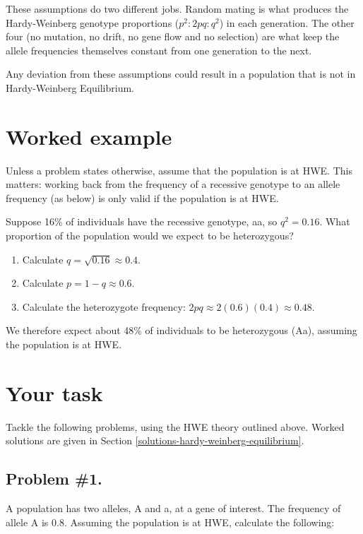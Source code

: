 \documentclass[
  a4paper]{book}
\providecommand{\tightlist}{%
  \setlength{\itemsep}{0pt}\setlength{\parskip}{0pt}}
\begin{document}
These assumptions do two different jobs. Random mating is what produces the Hardy-Weinberg genotype proportions (\(p^2 : 2pq : q^2\)) in each generation. The other four (no mutation, no drift, no gene flow and no selection) are what keep the allele frequencies themselves constant from one generation to the next.

Any deviation from these assumptions could result in a population that is not in Hardy-Weinberg Equilibrium.

\section{Worked example}\label{worked-example-8}

Unless a problem states otherwise, assume that the population is at HWE. This matters: working back from the frequency of a recessive genotype to an allele frequency (as below) is only valid if the population is at HWE.

Suppose 16\% of individuals have the recessive genotype, aa, so \(q^2 = 0.16\). What proportion of the population would we expect to be heterozygous?

\begin{enumerate}
\def\labelenumi{\arabic{enumi}.}
\tightlist
\item
  Calculate \(q = \sqrt{0.16} \approx 0.4\).
\item
  Calculate \(p = 1 - q \approx 0.6\).
\item
  Calculate the heterozygote frequency: \(2pq \approx 2(0.6)(0.4) \approx 0.48\).
\end{enumerate}

We therefore expect about 48\% of individuals to be heterozygous (Aa), assuming the population is at HWE.

\section{Your task}\label{your-task-14}

Tackle the following problems, using the HWE theory outlined above. Worked solutions are given in Section \ref{solutions-hardy-weinberg-equilibrium}.

\subsection{Problem \#1.}\label{problem-1.}

A population has two alleles, A and a, at a gene of interest. The frequency of allele A is 0.8. Assuming the population is at HWE, calculate the following:
\end{document}
